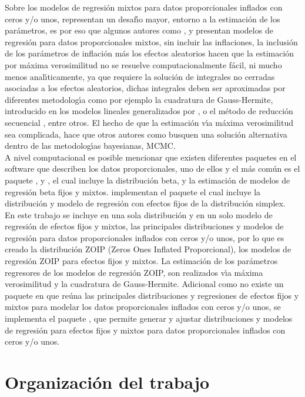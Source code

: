 Sobre los modelos de regresi\'{o}n mixtos para datos proporcionales inflados con ceros y/o unos, representan un desaf\'{\i}o mayor, entorno a la estimaci\'{o}n de los par\'{a}metros, es por eso que algunos autores como \cite{Usuga1}, \cite{Bonat2} \cite{Song1} y \cite{Stasinopoulos2} presentan modelos de regresi\'{o}n para datos proporcionales mixtos, sin incluir las inflaciones, la inclusi\'{o}n de los par\'{a}metros de inflaci\'{o}n m\'{a}s los efectos aleatorios hacen que la estimaci\'{o}n por m\'{a}xima verosimilitud no se resuelve computacionalmente f\'{a}cil, ni mucho menos anal\'{\i}ticamente, ya que requiere la soluci\'{o}n de integrales no cerradas asociadas a los efectos aleatorios, dichas integrales deben ser aproximadas por diferentes metodolog\'{\i}a como por ejemplo la cuadratura de Gauss-Hermite, introducido en los modelos lineales generalizados por \cite{Fahrmeir1}, o el m\'{e}todo de reducci\'{o}n secuencial \citep{Ogden1}, entre otros. El hecho de que la estimaci\'{o}n v\'{\i}a m\'{a}xima verosimilitud sea complicada, hace que otros autores como \cite{Galvis1} busquen una soluci\'{o}n alternativa dentro de las metodolog\'{\i}as bayesianas, MCMC.\\

A nivel computacional es posible mencionar que existen diferentes paquetes en el software  que describen los datos proporcionales, uno de ellos y el m\'{a}s com\'{u}n es el paquete  \citep{Zeileis1}, \citep{Ferrari1} y \citep{Simas1}, el cual incluye la distribuci\'{o}n beta, y la estimaci\'{o}n de modelos de regresi\'{o}n beta fijos y mixtos. \cite{Qiu1} implementan el paquete  el cual incluye la distribuci\'{o}n y modelo de regresi\'{o}n con efectos fijos de la distribuci\'{o}n simplex.\\

En este trabajo se incluye en una sola distribuci\'{o}n y en un solo modelo de regresi\'{o}n de efectos fijos y mixtos, las principales distribuciones y modelos de regresi\'{o}n para datos proporcionales inflados con ceros y/o unos, por lo que es creado la distribuci\'{o}n ZOIP (Zeros Ones Inflated Proporcional), los modelos de regresi\'{o}n ZOIP para efectos fijos y mixtos. La estimaci\'{o}n de los par\'{a}metros regresores de los modelos de regresi\'{o}n ZOIP, son realizados v\'{\i}a m\'{a}xima verosimilitud y la cuadratura de Gauss-Hermite. Adicional como no existe un paquete en  que re\'{u}na las principales distribuciones y regresiones de efectos fijos y mixtos para modelar los datos proporcionales inflados con ceros y/o unos, se implementa el paquete , que permite generar y ajustar distribuciones y modelos de regresi\'{o}n para efectos fijos y mixtos para datos proporcionales inflados con ceros y/o unos.

\section{Organizaci\'{o}n del trabajo}
